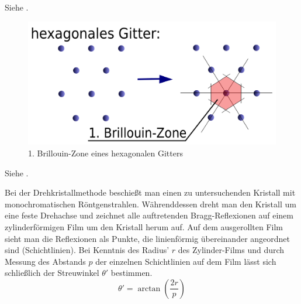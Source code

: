 \label{q:74}

Siehe .

\label{q:75}

\begin{figure}[H]
    \centering
    \begin{samepage}
        \includegraphics[width=0.6\linewidth]{resources/31-10-2013/BZ1_hexagonal.png}
        \caption{1. Brillouin-Zone eines hexagonalen Gitters}
    \end{samepage}
\end{figure}

\label{q:76}

Siehe .

\label{q:77}

Bei der Drehkristallmethode beschießt man einen zu untersuchenden Kristall mit monochromatischen Röntgenstrahlen. Währenddessen dreht man den Kristall um eine feste Drehachse und zeichnet alle auftretenden Bragg-Reflexionen auf einem zylinderförmigen Film um den Kristall herum auf. Auf dem ausgerollten Film sieht man die Reflexionen als Punkte, die linienförmig übereinander angeordnet sind (Schichtlinien). Bei Kenntnis des Radius' $r$ des Zylinder-Films und durch Messung des Abstands $p$ der einzelnen Schichtlinien auf dem Film lässt sich schließlich der Streuwinkel $\theta'$ bestimmen.
\begin{equation}
    \label{eq:drehkristallmethode}
    \theta' = \arctan\left(\frac{2r}{p}\right)
\end{equation}




\label{q:78}

